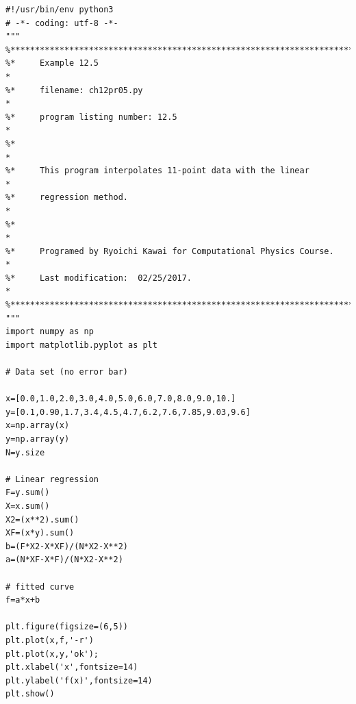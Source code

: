 \bigskip
\noindent
\program
\footnotesize
\begin{verbatim}
#!/usr/bin/env python3
# -*- coding: utf-8 -*-
"""
%**************************************************************************
%*     Example 12.5                                                       *
%*     filename: ch12pr05.py                                              *
%*     program listing number: 12.5                                       *
%*                                                                        *
%*     This program interpolates 11-point data with the linear            *
%*     regression method.                                                 *
%*                                                                        *
%*     Programed by Ryoichi Kawai for Computational Physics Course.       *
%*     Last modification:  02/25/2017.                                    *
%**************************************************************************
"""
import numpy as np
import matplotlib.pyplot as plt

# Data set (no error bar)

x=[0.0,1.0,2.0,3.0,4.0,5.0,6.0,7.0,8.0,9.0,10.]
y=[0.1,0.90,1.7,3.4,4.5,4.7,6.2,7.6,7.85,9.03,9.6]
x=np.array(x)
y=np.array(y)
N=y.size

# Linear regression
F=y.sum()
X=x.sum()
X2=(x**2).sum()
XF=(x*y).sum()
b=(F*X2-X*XF)/(N*X2-X**2)
a=(N*XF-X*F)/(N*X2-X**2)

# fitted curve
f=a*x+b

plt.figure(figsize=(6,5))
plt.plot(x,f,'-r')
plt.plot(x,y,'ok');
plt.xlabel('x',fontsize=14)
plt.ylabel('f(x)',fontsize=14)
plt.show()
\end{verbatim}
\normalsize


